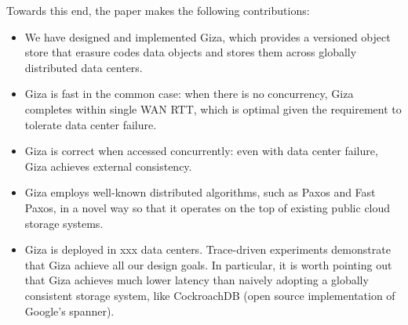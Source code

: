 Towards this end, the paper makes the following contributions:
\begin{itemize}
    \item We have designed and implemented Giza, which provides a versioned object store that erasure codes data objects and stores them across globally distributed data centers.
    \item Giza is fast in the common case: when there is no concurrency, Giza completes within single WAN RTT, which is optimal given the requirement to tolerate data center failure.
    \item Giza is correct when accessed concurrently: even with data center failure, Giza achieves external consistency.
    \item Giza employs well-known distributed algorithms, such as Paxos and Fast Paxos, in a novel way so that it operates on the top of existing public cloud storage systems.
    \item Giza is deployed in xxx data centers. Trace-driven experiments demonstrate that Giza achieve all our design goals. In particular, it is worth pointing out that Giza achieves much lower latency than naively adopting a globally consistent storage system, like CockroachDB (open source implementation of Google's spanner).
\end{itemize}
